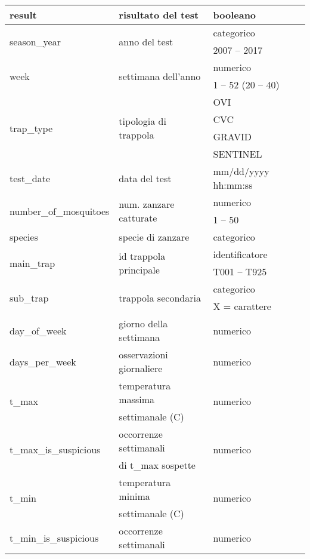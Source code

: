 \begin{longtable}{lll}
	result	& risultato del test  &	booleano \\\hline
	\multirow{2}{*}{season\_year} & \multirow{2}{*}{anno del test} &  
	categorico \\
	& &{2007} -- {2017}       	\\ \hline
	\multirow{2}{*}{week}					&\multirow{2}{*}{settimana 
		dell'anno}  & numerico    \\ 
	& & {1} -- {52} ({20} -- {40})\\\hline
	\multirow{4}{*}{trap\_type}				& \multirow{4}{*}{tipologia di 
		trappola} &     OVI\\
	&& CVC\\
	&& GRAVID\\
	&& SENTINEL\\\hline
	{test\_date}	&{data del test}   &   mm/dd/yyyy hh:mm:ss \\\hline
	\multirow{2}{*}{number\_of\_mosquitoes}	& \multirow{2}{*}{num. zanzare 
		catturate} &  numerico        	\\ 
	& & {1} -- {50} \\ \hline
	species & specie di zanzare	 &	categorico\\	\hline	
	\multirow{2}{*}{main\_trap}	&\multirow{2}{*}{id trappola principale} 
	&  	identificatore        	\\ 
	& & T001 -- T925\\\hline
	\multirow{2}{*}{sub\_trap}	&\multirow{2}{*}{trappola 
		secondaria} &  categorico        	\\ 
	&& X = carattere\\\hline
	{day\_of\_week}	& {giorno della 
		settimana} &  numerico  \\\hline
	days\_per\_week & {osservazioni giornaliere}	& numerico \\ \hline
	\multirow{2}{*}{t\_max}	& temperatura massima & \multirow{2}{*}{numerico}\\
	& settimanale (\degree C) & \\ \hline
	\multirow{2}{*}{t\_max\_is\_suspicious}		& occorrenze settimanali   
	&  \multirow{2}{*}{numerico}	 \\
	& di t\_max sospette & 	 \\ \hline	
	\multirow{2}{*}{t\_min}		& temperatura minima  	  & 
	\multirow{2}{*}{numerico}		\\
	& settimanale (\degree C) & \\ \hline
	\multirow{2}{*}{t\_min\_is\_suspicious}	& occorrenze settimanali  &  
	\multirow{2}{*}{numerico}	 \\

\end{longtable}
